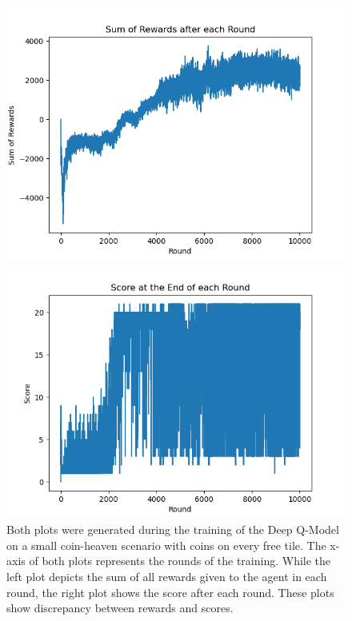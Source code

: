 \begin{figure}[H]
	\centering
	\begin{minipage}{0.49\textwidth}
		\centering
		\includegraphics[scale=0.52]{images/rewards_converged.png}
	\end{minipage}
	\begin{minipage}{0.49\textwidth}
		\centering
		\includegraphics[scale=0.52]{images/scores_not_converged.png}
	\end{minipage}
	\caption{Both plots were generated during the training of the Deep Q-Model on a small coin-heaven scenario with coins on every free tile. The x-axis of both plots represents the rounds of the training. While the left plot depicts the sum of all rewards given to the agent in each round, the right plot shows the score after each round. These plots show discrepancy between rewards and scores.}
	\label{fig:rewardVSscore}
\end{figure}

